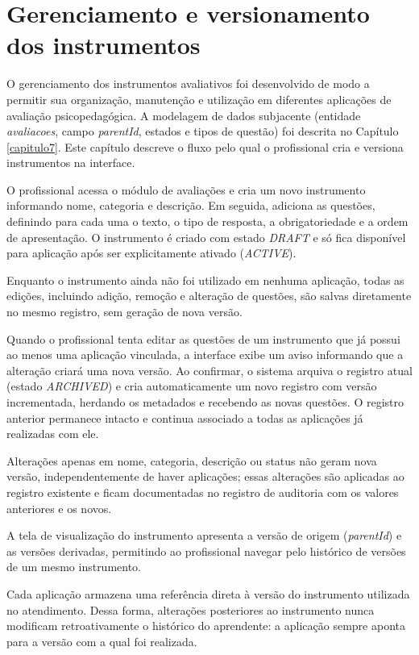 \section{Gerenciamento e versionamento dos instrumentos}

O gerenciamento dos instrumentos avaliativos foi desenvolvido de modo a permitir sua organização, manutenção e utilização em diferentes aplicações de avaliação psicopedagógica. A modelagem de dados subjacente (entidade \textit{avaliacoes}, campo \textit{parentId}, estados e tipos de questão) foi descrita no Capítulo \ref{capitulo7}. Este capítulo descreve o fluxo pelo qual o profissional cria e versiona instrumentos na interface.

O profissional acessa o módulo de avaliações e cria um novo instrumento informando nome, categoria e descrição. Em seguida, adiciona as questões, definindo para cada uma o texto, o tipo de resposta, a obrigatoriedade e a ordem de apresentação. O instrumento é criado com estado \textit{DRAFT} e só fica disponível para aplicação após ser explicitamente ativado (\textit{ACTIVE}).

Enquanto o instrumento ainda não foi utilizado em nenhuma aplicação, todas as edições, incluindo adição, remoção e alteração de questões, são salvas diretamente no mesmo registro, sem geração de nova versão.

Quando o profissional tenta editar as questões de um instrumento que já possui ao menos uma aplicação vinculada, a interface exibe um aviso informando que a alteração criará uma nova versão. Ao confirmar, o sistema arquiva o registro atual (estado \textit{ARCHIVED}) e cria automaticamente um novo registro com versão incrementada, herdando os metadados e recebendo as novas questões. O registro anterior permanece intacto e continua associado a todas as aplicações já realizadas com ele.

Alterações apenas em nome, categoria, descrição ou status não geram nova versão, independentemente de haver aplicações; essas alterações são aplicadas ao registro existente e ficam documentadas no registro de auditoria com os valores anteriores e os novos.

A tela de visualização do instrumento apresenta a versão de origem (\textit{parentId}) e as versões derivadas, permitindo ao profissional navegar pelo histórico de versões de um mesmo instrumento.

Cada aplicação armazena uma referência direta à versão do instrumento utilizada no atendimento. Dessa forma, alterações posteriores ao instrumento nunca modificam retroativamente o histórico do aprendente: a aplicação sempre aponta para a versão com a qual foi realizada.

